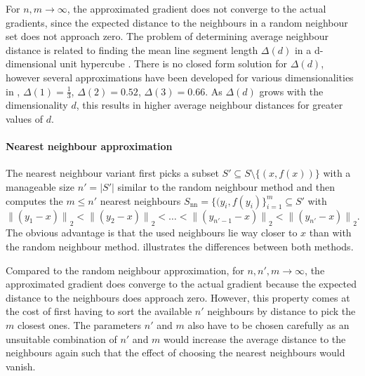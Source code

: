 \documentclass[
  a4paper,  %
  twoside,  %
  bibliography=totoc,
  headsepline,
  cleardoublepage=empty,
  parskip=half,
  draft=false
]{scrbook}
\begin{document}
For $n,m \to \infty$, the approximated gradient does not converge to the actual gradients, since the expected distance to the neighbours in a random neighbour set does not approach zero.
The problem of determining average neighbour distance is related to finding the mean line segment length $\Delta (d)$ in a d-dimensional unit hypercube \cite{Bailey2007}.
There is no closed form solution for $\Delta (d)$, however several approximations have been developed for various dimensionalities in \cite{Weisstein}, \eg $\Delta (1)=\frac{1}{3}$, $\Delta (2)=0.52$, $\Delta (3)=0.66$.
As $\Delta (d)$ grows with the dimensionality $d$, this results in higher average neighbour distances for greater values of $d$.

\paragraph{Nearest neighbour approximation}
The nearest neighbour variant first picks a subset $S' \subseteq S \setminus \{(x, f(x))\}$ with a manageable size $n'=|S'|$ similar to the random neighbour method and then computes the $m \leq n'$ nearest neighbours $S_{\text{nn}}=\{(y_i, f(y_i)\}_{i=1}^m \subseteq S'$ with
\begin{equation}
{\|(y_1-x)\|}_2 < {\|(y_2-x)\|}_2 < \dots < {\|(y_{n'-1}-x)\|}_2 < {\|(y_{n'}-x)\|}_2.
\end{equation}
The obvious advantage is that the used neighbours lie way closer to $x$ than with the random neighbour method.
 illustrates the differences between both methods.

Compared to the random neighbour approximation, for $n,n',m \to \infty$, the approximated gradient does converge to the actual gradient because the expected distance to the neighbours does approach zero.
However, this property comes at the cost of first having to sort the available $n'$ neighbours by distance to pick the $m$ closest ones.
The parameters $n'$ and $m$ also have to be chosen carefully as an unsuitable combination of $n'$ and $m$ would increase the average distance to the neighbours again such that the effect of choosing the nearest neighbours would vanish.
\end{document}
